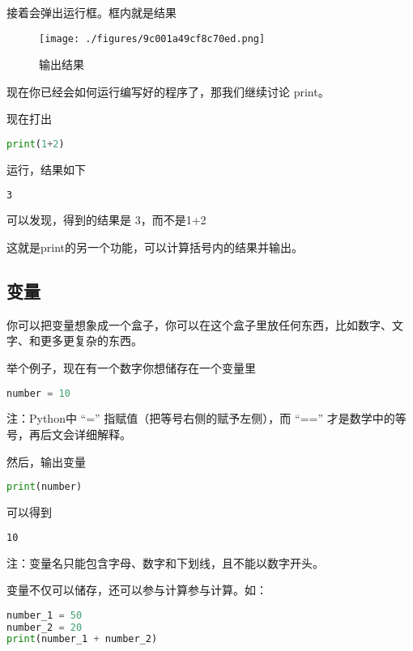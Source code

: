 接着会弹出运行框。框内就是结果

\begin{figure}[ht]
\centering
\texttt{[image: ./figures/9c001a49cf8c70ed.png]}
\caption{输出结果} \label{fig_Pyc2_6}
\end{figure}

现在你已经会如何运行编写好的程序了，那我们继续讨论 print。

现在打出

\begin{lstlisting}[language=python]
print(1+2)
\end{lstlisting}

运行，结果如下

\begin{lstlisting}[language=bash]
3
\end{lstlisting}

可以发现，得到的结果是 3，而不是1+2

这就是print的另一个功能，可以计算括号内的结果并输出。

\subsection{变量}

你可以把变量想象成一个盒子，你可以在这个盒子里放任何东西，比如数字、文字、和更多更复杂的东西。

举个例子，现在有一个数字你想储存在一个变量里

\begin{lstlisting}[language=python]
number = 10
\end{lstlisting}

注：Python中 “=” 指赋值（把等号右侧的赋予左侧），而 “==” 才是数学中的等号，再后文会详细解释。

然后，输出变量

\begin{lstlisting}[language=python]
print(number)
\end{lstlisting}

可以得到

\begin{lstlisting}[language=bash]
10
\end{lstlisting}

注：变量名只能包含字母、数字和下划线，且不能以数字开头。

变量不仅可以储存，还可以参与计算参与计算。如：

\begin{lstlisting}[language=python]
number_1 = 50
number_2 = 20
print(number_1 + number_2)
\end{lstlisting}

